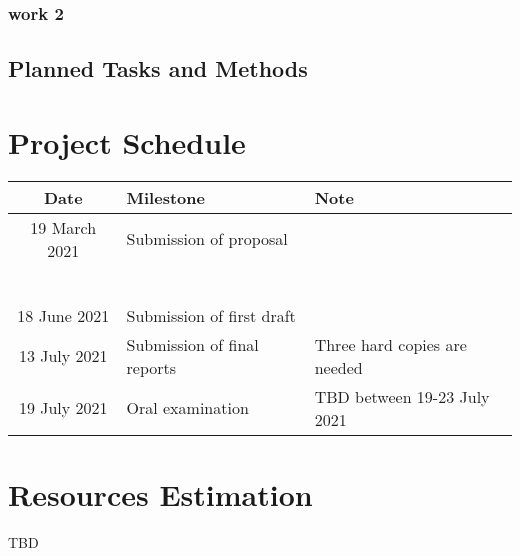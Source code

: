 \documentclass[12pt,a4paper]{article}
\begin{document}
\subsubsection{work 2}


\subsection{Planned Tasks and Methods}

\section{Project Schedule}
\begin{tabular}{|c|c|c|}
\hline
Date          & \multicolumn{1}{l|}{Milestone} & \multicolumn{1}{l|}{Note} \\ \hline
19 March 2021 & \multicolumn{1}{l|}{Submission of proposal} & \\ \hline
 &  & \\ \hline
 &  & \\ \hline
 &  & \\ \hline
 &  & \\ \hline
 &  & \\ \hline
 &  & \\ \hline
18 June  2021 & \multicolumn{1}{l|}{Submission of first draft} & \\ \hline
13 July  2021 & \multicolumn{1}{l|}{Submission of final reports} & \multicolumn{1}{l|}{Three hard copies are needed}\\ \hline
19 July  2021 & \multicolumn{1}{l|}{Oral examination} & \multicolumn{1}{l|}{TBD between 19-23 July 2021}\\ \hline
\end{tabular}

\section{Resources Estimation}
TBD



\end{document}
